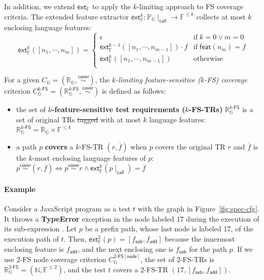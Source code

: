 \documentclass[acmsmall,review,screen]{acmart}
\newcommand{\tif}{\text{if} \; }
\newcommand{\telse}{\text{otherwise}}
\newcommand{\name}[1]{\textsf{#1}}
\newcommand{\jscode}[1]{\text{\lstinline[style=JS]!#1!}}
\newcommand{\graph}{\mathbb{G}}
\newcommand{\nodeset}{\mathbb{N}}
\newcommand{\node}{n}
\newcommand{\patset}[1]{\mathbb{P}_{#1}}
\newcommand{\pat}{p}
\newcommand{\test}{t}
\newcommand{\cover}{\overset{\name{cover}}{\sim}}
\newcommand{\trset}[1]{\mathbb{R}_{#1}}
\newcommand{\tr}{r}
\newcommand{\cov}[1]{C_{#1}}
\newcommand{\featset}{\mathbb{F}}
\newcommand{\feat}{f}
\newcommand{\addfeat}{\feat_{\name{add}}}
\newcommand{\subfeat}{\feat_{\name{sub}}}
\newcommand{\feats}{\overline{\feat}} %
\newcommand{\featmap}{\name{feat}}
\newcommand{\extfeat}{\name{ext}_\featset}
\newcommand{\extfeats}[1]{\extfeat^{#1}}
\newcommand{\css}[1]{{#1}\!\mid_{\name{call}}}
\newcommand{\kfcov}[2]{\cov{#2}^{{#1}\name{-FS}}}
\newcommand{\kfnodecov}[2]{\cov{#2}^{{#1}\name{-FS}[\name{node}]}}
\newcommand{\kftrset}[2]{\trset{#2}^{{#1}\name{-FS}}}
\providecommand{\DIFdeltex}[1]{{\protect\color{red}\sout{#1}}}                      %
\providecommand{\DIFdelbegin}{} %
\providecommand{\DIFdelend}{} %
\providecommand{\DIFdel}[1]{\texorpdfstring{\DIFdeltex{#1}}{}} %
\newcommand{\DIFscaledelfig}{0.5}
\newlength{\DIFdelgraphicswidth} %
\newlength{\DIFdelgraphicsheight} %
\newcommand{\DIFdelincludegraphics}[2][]{%
\sbox{\DIFdelgraphicsbox}{\DIFOincludegraphics[#1]{#2}}%
\settoboxwidth{\DIFdelgraphicswidth}{\DIFdelgraphicsbox} %
\settoboxtotalheight{\DIFdelgraphicsheight}{\DIFdelgraphicsbox} %
\scalebox{\DIFscaledelfig}{%
\parbox[b]{\DIFdelgraphicswidth}{\usebox{\DIFdelgraphicsbox}\\[-\baselineskip] \rule{\DIFdelgraphicswidth}{0em}}\llap{\resizebox{\DIFdelgraphicswidth}{\DIFdelgraphicsheight}{%
\setlength{\unitlength}{\DIFdelgraphicswidth}%
\begin{picture}(1,1)%
\thicklines\linethickness{2pt} %
{\color[rgb]{1,0,0}\put(0,0){\framebox(1,1){}}}%
{\color[rgb]{1,0,0}\put(0,0){\line( 1,1){1}}}%
{\color[rgb]{1,0,0}\put(0,1){\line(1,-1){1}}}%
\end{picture}%
}\hspace*{3pt}}} %
} %
\DeclareRobustCommand{\DIFdelbegin}{\DIFOdelbegin \let\includegraphics\DIFdelincludegraphics} %
\DeclareRobustCommand{\DIFdelend}{\DIFOaddend \let\includegraphics\DIFOincludegraphics} %
\begin{document}
In addition, we extend $\extfeat$ to apply the $k$-limiting approach to FS coverage
criteria. The extended feature extractor $\extfeats{k}: \css{\patset{\graph}}
\rightarrow \featset^{\leq k}$ collects at most $k$ enclosing language features:
%
\begin{equation}\label{equ:extfeats}
  \extfeats{k}([\node_1, \cdots, \node_m]) = \left\{
    \begin{array}{ll}
      \epsilon & \tif k = 0 \vee m = 0\\

      \extfeats{k-1}([\node_1, \cdots, \node_{m-1}]) \cdot \feat & \tif
      \featmap(\node_m) = \feat\\

      \extfeats{k}([\node_1, \cdots, \node_{m-1}]) & \telse\\
    \end{array}
  \right.
\end{equation}


\begin{definition}\label{def:k-fs-cov}
  For a given $\cov{\graph} = (\trset{\graph}, \cover)$, the
  \textit{$k$-limiting feature-sensitive ($k$-FS) coverage} criterion
  $\kfcov{k}{\graph} = (\kftrset{k}{\graph}, \cover)$ is defined as follows:
  \begin{itemize}
    \item the set of \textbf{$k$-feature-sensitive test requirements
      ($k$-FS-TRs)} $\kftrset{k}{\graph}$ is a set of original TRs \DIFdelbegin \DIFdel{tagged }\DIFdelend with at most
      $k$ language features:
$
        \kftrset{k}{\graph} = \trset{\graph} \times \featset^{\leq k}
$
    \item a path $\pat$ \textbf{covers} a $k$-FS-TR $(\tr, \feats)$ when $\pat$
      covers the original TR $\tr$ and $\feats$ is the $k$-most enclosing
      language features of $\pat$:
$
        \pat \cover (\tr, \feats) \iff \pat \cover \tr \wedge
        \extfeats{k}(\css{\pat}) = \feats
$
  \end{itemize}
\end{definition}


\paragraph{\textbf{Example}}
%
Consider a JavaScript program \jscode{[] - (2n + 1)} as a test $\test$ with the
graph in Figure~\ref{fig:spec-cfg}.
%
It throws a \textbf{TypeError} exception in the node labeled 17 during the execution
of its sub-expression \jscode{2n + 1}.
%
Let $\pat$ be a prefix path, whose last node is labeled 17, of the execution path
of $\test$.
%
Then, $\extfeats{2}(\pat) = [\subfeat, \addfeat]$ because the innermost enclosing
feature is $\addfeat$, and the next enclosing one is $\subfeat$ for the
path $\pat$.
%
If we use 2-FS node coverage criterion $\kfnodecov{2}{\graph}$, the set of
2-FS-TRs is $\kftrset{2}{\graph} = (\nodeset, \featset^{\leq 2})$, and the test
$\test$ covers a 2-FS-TR $(17, [\subfeat, \addfeat])$.
\end{document}
